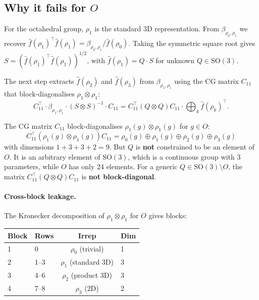 \documentclass{article}
\theoremstyle{definition}
\theoremstyle{remark}
\newcommand{\SO}{\mathrm{SO}}
\theoremstyle{definition}
\begin{document}
\subsection{Why it fails for $O$}

For the octahedral group, $\rho_1$ is the standard 3D representation.
From $\beta_{\rho_0, \rho_1}$ we recover
$\hat{f}(\rho_1)^\top \hat{f}(\rho_1) =
\beta_{\rho_0,\rho_1}/\hat{f}(\rho_0)$.
Taking the symmetric square root gives
$S = (\hat{f}(\rho_1)^\top \hat{f}(\rho_1))^{1/2}$, with
$\hat{f}(\rho_1) = Q \cdot S$ for unknown $Q \in \SO(3)$.

The next step extracts $\hat{f}(\rho_2)$ and $\hat{f}(\rho_3)$
from $\beta_{\rho_1, \rho_1}$ using the CG matrix $C_{11}$ that
block-diagonalises $\rho_1 \otimes \rho_1$:
\[
  C_{11}^\top \cdot \beta_{\rho_1,\rho_1} \cdot (S \otimes S)^{-1}
  \cdot C_{11}
  = C_{11}^\top (Q \otimes Q) C_{11}
  \cdot \bigoplus_k \hat{f}(\rho_k)^\top.
\]

The CG matrix $C_{11}$ block-diagonalises
$\rho_1(g) \otimes \rho_1(g)$ for $g \in O$:
\[
  C_{11}^\top (\rho_1(g) \otimes \rho_1(g)) C_{11}
  = \rho_0(g) \oplus \rho_1(g) \oplus \rho_2(g) \oplus \rho_3(g)
\]
with dimensions $1 + 3 + 3 + 2 = 9$. But $Q$ is \textbf{not}
constrained to be an element of $O$. It is an arbitrary element of
$\SO(3)$, which is a continuous group with 3 parameters, while $O$ has
only 24 elements. For a generic $Q \in \SO(3) \setminus O$, the matrix
$C_{11}^\top (Q \otimes Q) C_{11}$ is \textbf{not block-diagonal}.

\paragraph{Cross-block leakage.}
The Kronecker decomposition of $\rho_1 \otimes \rho_1$ for $O$ gives
blocks:

\begin{center}
\small
\begin{tabular}{llcl}
  \toprule
  Block & Rows & Irrep & Dim \\
  \midrule
  1 & 0     & $\rho_0$ (trivial)     & 1 \\
  2 & 1--3  & $\rho_1$ (standard 3D) & 3 \\
  3 & 4--6  & $\rho_2$ (product 3D)  & 3 \\
  4 & 7--8  & $\rho_3$ (2D)          & 2 \\
  \bottomrule
\end{tabular}
\end{center}
\end{document}

